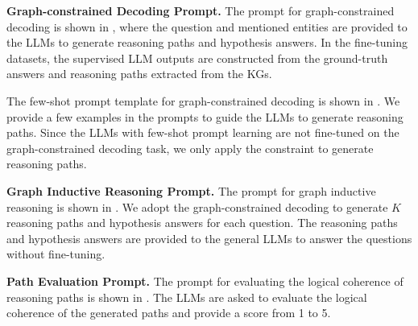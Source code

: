 \noindent\textbf{Graph-constrained Decoding Prompt.}
The prompt for graph-constrained decoding is shown in , where the question and mentioned entities are provided to the LLMs to generate reasoning paths and hypothesis answers. In the fine-tuning datasets, the supervised LLM outputs are constructed from the ground-truth answers and reasoning paths extracted from the KGs.


The few-shot prompt template for graph-constrained decoding is shown in . We provide a few examples in the prompts to guide the LLMs to generate reasoning paths. Since the LLMs with few-shot prompt learning are not fine-tuned on the graph-constrained decoding task, we only apply the constraint to generate reasoning paths.

\noindent\textbf{Graph Inductive Reasoning Prompt.} The prompt for graph inductive reasoning is shown in . We adopt the graph-constrained decoding to generate $K$ reasoning paths and hypothesis answers for each question. The reasoning paths and hypothesis answers are provided to the general LLMs to answer the questions without fine-tuning.

\noindent\textbf{Path Evaluation Prompt.} The prompt for evaluating the logical coherence of reasoning paths is shown in . The LLMs are asked to evaluate the logical coherence of the generated paths and provide a score from 1 to 5.



